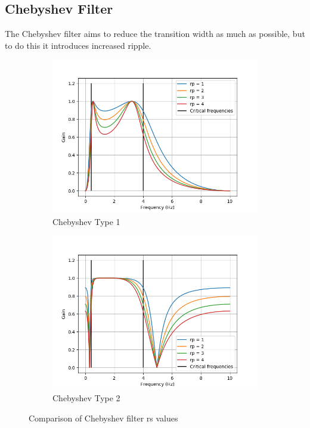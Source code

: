 \documentclass[12pt,a4paper,twoside,openright]{report}
\begin{document}
\subsection{Chebyshev Filter}

The Chebyshev filter aims to reduce the transition width as much as possible,
but to do this it introduces increased ripple.

\begin{figure}[h]
\begin{subfigure}{.5\textwidth}
  \centering
  \includegraphics[width=\linewidth]{figs/cheby1-rp-comparison.png}
  \caption{Chebyshev Type 1}
  \label{fig:cheby1rs}
\end{subfigure}%
\begin{subfigure}{.5\textwidth}
  \centering
  \includegraphics[width=\linewidth]{figs/cheby2-rp-comparison.png}
  \caption{Chebyshev Type 2}
  \label{fig:cheby2rs}
\end{subfigure}
\caption{Comparison of Chebyshev filter rs values}
\label{fig:chebyrs}
\end{figure}
\end{document}
